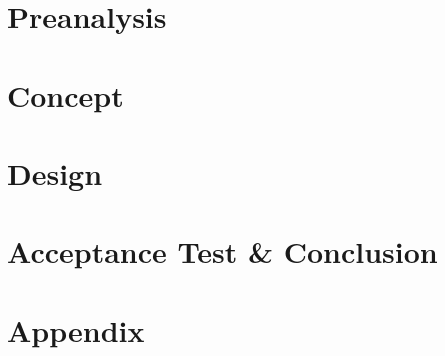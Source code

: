 

\pagestyle{fancy}



\part{Preanalysis}



\part{Concept}









\part{Design}











\part{Acceptance Test \& Conclusion}











\label{bib:mybiblio}
 
 \newpage
\fancyhead[RE,LO]{}
 \titleformat{\section}[hang]{\Large\bfseries}{\thesection\hsp\textcolor{black}{|}\hsp}{0pt}{\Large\bfseries}

 \setcounter{section}{0}
 \part{Appendix}
 \appendix




